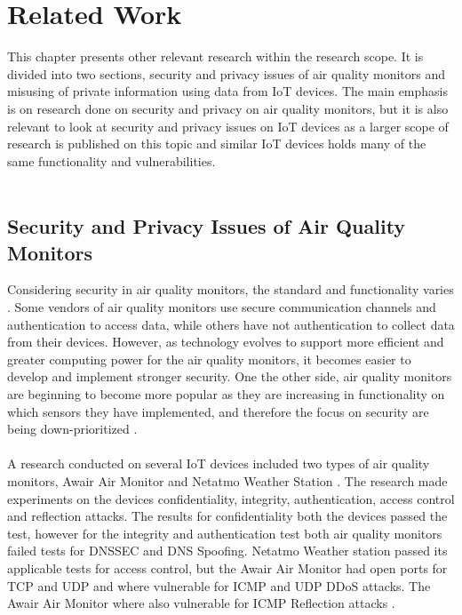 \chapter{Related Work}
This chapter presents other relevant research within the research scope. It is divided into two sections, security and privacy issues of air quality monitors and misusing of private information using data from IoT devices. The main emphasis is on research done on security and privacy on air quality monitors, but it is also relevant to look at security and privacy issues on IoT devices as a larger scope of research is published on this topic and similar IoT devices holds many of the same functionality and vulnerabilities.\\\\
\section{Security and Privacy Issues of Air Quality Monitors}
Considering security in air quality monitors, the standard and functionality varies \cite{AQMHowFarFunctionality}. Some vendors of air quality monitors use secure communication channels and authentication to access data, while others have not authentication to collect data from their devices. However, as technology evolves to support more efficient and greater computing power for the air quality monitors, it becomes easier to develop and implement stronger security. One the other side, air quality monitors are beginning to become more popular as they are increasing in functionality on which sensors they have implemented, and therefore the focus on security are being down-prioritized \cite{SecurityAndDataIntInAQM}.
\\\\ 
A research conducted on several IoT devices included two types of air quality monitors, Awair Air Monitor and Netatmo Weather Station \cite{IoTSecurityandPrivacyImpl}. The research made experiments on the devices confidentiality, integrity, authentication, access control and reflection attacks. The results for confidentiality both the devices passed the test, however for the integrity and authentication test both air quality monitors failed tests for DNSSEC and DNS Spoofing. Netatmo Weather station passed its applicable tests for access control, but the Awair Air Monitor had open ports for TCP and UDP and where vulnerable for ICMP and UDP DDoS attacks. The Awair Air Monitor where also vulnerable for ICMP Reflection attacks \cite{IoTSecurityandPrivacyImpl}.
\\\\
